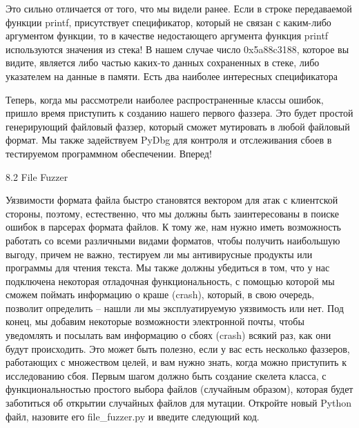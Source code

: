 \documentclass[12pt, a4paper, oneside]{book}
\begin{document}
Это сильно отличается от того, что мы видели ранее. Если в строке передаваемой функции printf, присутствует спецификатор, который не связан с каким-либо аргументом функции, то в качестве недостающего аргумента функция printf используются значения из стека! В нашем случае число 0x5a88c3188, которое вы видите, является либо частью каких-то данных сохраненных в стеке, либо указателем на данные в памяти. Есть два наиболее интересных спецификатора %

Теперь, когда мы рассмотрели наиболее распространенные классы ошибок, пришло время приступить к созданию нашего первого фаззера. Это будет простой генерирующий файловый фаззер, который сможет мутировать в любой файловый формат. Мы также задействуем PyDbg для контроля и отслеживания сбоев в тестируемом программном обеспечении. Вперед!


8.2 File Fuzzer

Уязвимости формата файла быстро становятся вектором для атак с клиентской стороны, поэтому, естественно, что мы должны быть заинтересованы в поиске ошибок в парсерах формата файлов. К тому же, нам нужно иметь возможность работать со всеми различными видами форматов, чтобы получить наибольшую выгоду, причем не важно, тестируем ли мы антивирусные продукты или программы для чтения текста. Мы также должны убедиться в том, что у нас подключена некоторая отладочная функциональность, с помощью которой мы сможем поймать информацию о краше (crash), который, в свою очередь, позволит определить – нашли ли мы эксплуатируемую уязвимость или нет. Под конец, мы добавим некоторые возможности электронной почты, чтобы уведомлять и посылать вам информацию о сбоях (crash) всякий раз, как они будут происходить. Это может быть полезно, если у вас есть несколько фаззеров, работающих с множеством целей, и вам нужно знать, когда можно приступить к исследованию сбоя. Первым шагом должно быть создание скелета класса, с функциональностью простого выбора файлов (случайным образом), которая будет заботиться об открытии случайных файлов для мутации. Откройте новый Python файл, назовите его file\_fuzzer.py и введите следующий код.
\end{document}
